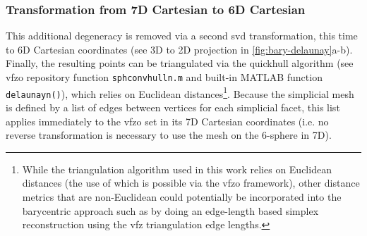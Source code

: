 \documentclass[final,twocolumn,12pt]{elsarticle}
\newcommand{\inpt}{input}
\newcommand{\vfzorepo}{\gls{vfzo} repository}
\begin{document}
{\begin{appendices}
\subsubsection{ Transformation from 7D Cartesian to 6D Cartesian}
\label{sec:app:bary:tri:svd2}
This additional degeneracy is removed via a second \gls{svd} transformation, this time to 6D Cartesian coordinates (see 3D to 2D projection in \cref{fig:bary-delaunay}a-b). Finally, the resulting points can be triangulated via the quickhull algorithm \cite{barberQuickhullAlgorithmConvex1996} (see \vfzorepo{} function \texttt{sphconvhulln.m} and built-in MATLAB function \texttt{delaunayn()}), which relies on Euclidean distances\footnote{While the triangulation algorithm used in this work relies on Euclidean distances (the use of which is possible via the \gls{vfzo} framework), other distance metrics that are non-Euclidean \cite{morawiecDistancesGrainInterfaces2019} could potentially be incorporated into the barycentric approach such as by doing an edge-length based simplex reconstruction \cite{connorHighdimensionalSimplexesSupermetric2017,boissonnatOnlyDistancesAre2017} using the \gls{vfz} triangulation edge lengths.}. Because the simplicial mesh is defined by a list of edges between vertices for each simplicial facet, this list applies immediately to the \gls{vfzo} set in its 7D Cartesian coordinates (i.e. no reverse transformation is necessary to use the mesh on the 6-sphere in 7D).



\end{appendices}}
\end{document}
